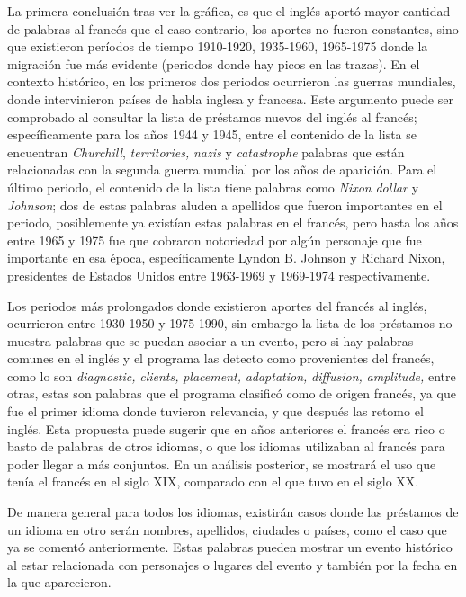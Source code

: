 La primera conclusión tras ver la gráfica, es que el inglés aportó mayor cantidad de palabras al francés que el caso contrario, los aportes no fueron constantes, sino que existieron períodos de tiempo 1910-1920, 1935-1960, 1965-1975 donde la migración fue más evidente (periodos donde hay picos en las trazas).  En el contexto histórico, en los primeros dos periodos ocurrieron las guerras mundiales, donde intervinieron países de habla inglesa y francesa.   Este argumento puede ser comprobado al consultar la lista de préstamos nuevos del inglés al francés; específicamente para los años 1944 y 1945, entre el contenido de la lista se encuentran \textit{Churchill}, \textit{territories,} \textit{nazis} y \textit{catastrophe} palabras que están relacionadas con la segunda guerra mundial por los años de aparición. Para el último periodo,  el contenido de la lista tiene palabras como \textit{Nixon} \textit{dollar} y \textit{Johnson}; dos de estas palabras aluden a apellidos que fueron importantes en el periodo, posiblemente ya existían estas palabras en el francés, pero hasta los años entre 1965 y 1975 fue que cobraron notoriedad por algún personaje que fue importante en esa época,  específicamente Lyndon B. Johnson y Richard Nixon, presidentes de Estados Unidos entre 1963-1969 y 1969-1974 respectivamente.

Los periodos más prolongados donde existieron aportes del francés al inglés,  ocurrieron entre 1930-1950 y 1975-1990,  sin embargo la lista de los préstamos no muestra palabras que se puedan asociar a un evento,   pero si hay palabras comunes en el inglés y el programa las detecto como provenientes del francés, como lo son \textit{diagnostic,} \textit{clients,} \textit{placement,} \textit{adaptation,} \textit{diffusion,} \textit{amplitude,} entre otras, estas son palabras que el programa clasificó como de origen francés, ya que fue el primer idioma donde tuvieron relevancia,  y que después las retomo el inglés. Esta propuesta puede sugerir que en años anteriores el francés era rico o basto de palabras de otros idiomas, o que los idiomas utilizaban al francés para poder llegar a más conjuntos. En un análisis posterior, se mostrará el uso que tenía el francés en el siglo XIX, comparado con el que tuvo en el siglo XX. 

De manera general para todos los idiomas, existirán casos donde las préstamos de un idioma en otro serán nombres, apellidos, ciudades o países, como el caso que ya se comentó anteriormente. Estas palabras pueden mostrar un evento histórico al estar relacionada con personajes o lugares del evento y también por la fecha en la que aparecieron. 


